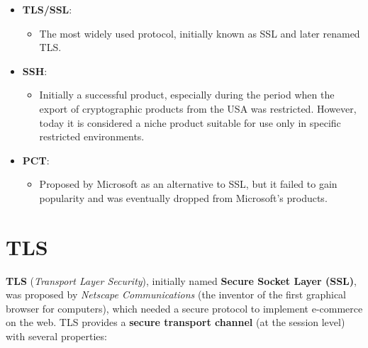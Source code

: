 \begin{itemize}
    \item \textbf{TLS/SSL}:
          \begin{itemize}
              \item The most widely used protocol, initially known as SSL and later renamed TLS.
          \end{itemize}
    \item \textbf{SSH}:
          \begin{itemize}
              \item Initially a successful product, especially during the period when the export of cryptographic products from the USA was restricted. However, today it is considered a niche product suitable for use only in specific restricted environments.
          \end{itemize}
    \item \textbf{PCT}:
          \begin{itemize}
              \item Proposed by Microsoft as an alternative to SSL, but it failed to gain popularity and was eventually dropped from Microsoft's products.
          \end{itemize}
\end{itemize}


\section{TLS}
\textbf{TLS} (\textit{Transport Layer Security}), initially named \textbf{Secure Socket Layer (SSL)}, was proposed by \textit{Netscape Communications} (the inventor of the first graphical browser for computers), which needed a secure protocol to implement e-commerce on the web. TLS provides a \textbf{secure transport channel} (at the session level) with several properties:

